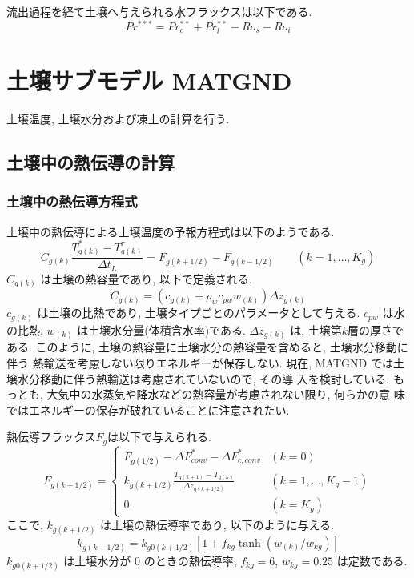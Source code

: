 流出過程を経て土壌へ与えられる水フラックスは以下である. 
\begin{equation}
 Pr^{***} = Pr^{**}_c + Pr^{**}_l - Ro_s - Ro_i
\end{equation}

\section{土壌サブモデル MATGND}

土壌温度, 土壌水分および凍土の計算を行う. 

\subsection{土壌中の熱伝導の計算}

\subsubsection{土壌中の熱伝導方程式}

土壌中の熱伝導による土壌温度の予報方程式は以下のようである. 
\begin{equation}
C_{g(k)} \frac{T_{g(k)}^* - T_{g(k)}^{\tau}}{\Delta t_L} = F_{g(k+1/2)} - F_{g(k-1/2)}
\qquad (k=1,\ldots,K_{g}) 
\label{gnd_diff}
\end{equation}
$C_{g(k)}$ は土壌の熱容量であり, 以下で定義される. 
\begin{equation}
 C_{g(k)} = ( c_{g(k)} + \rho_w c_{pw} w_{(k)} ) \Delta z_{g(k)}
\end{equation}
$c_{g(k)}$ は土壌の比熱であり, 土壌タイプごとのパラメータとして与える. 
$c_{pw}$ は水の比熱, $w_{(k)}$ は土壌水分量(体積含水率)である. 
$\Delta z_{g(k)}$ は, 土壌第$k$層の厚さである. 
このように, 土壌の熱容量に土壌水分の熱容量を含めると, 土壌水分移動に伴う
熱輸送を考慮しない限りエネルギーが保存しない. 
現在, MATGND では土壌水分移動に伴う熱輸送は考慮されていないので, その導
入を検討している. 
もっとも, 大気中の水蒸気や降水などの熱容量が考慮されない限り, 何らかの意
味ではエネルギーの保存が破れていることに注意されたい. 

熱伝導フラックス$F_{g}$は以下で与えられる. 
\begin{equation}
 F_{g(k+1/2)} =
\left\{
\begin{array}{ll}
F_{g(1/2)} - \Delta F_{conv}^* - \Delta F_{c,conv}^*
& (k=0)\\
\displaystyle{
k_{g(k+1/2)} \frac{T_{g(k+1)} - T_{g(k)}}{\Delta z_{g(k+1/2)}}
}
& (k=1,\ldots,K_{g}-1) \\
\displaystyle{
0
}
& (k=K_{g})
\end{array}
\right. 
\label{gnd_dflux}
\end{equation}
ここで, $k_{g(k+1/2)}$ は土壌の熱伝導率であり, 以下のように与える. 
\begin{equation}
 k_{g(k+1/2)} = k_{g0(k+1/2)} [ 1 + f_{kg} \tanh( w_{(k)}/ w_{kg} ) ]
\end{equation}
$k_{g0(k+1/2)}$ は土壌水分が $0$ のときの熱伝導率, $f_{kg}=6$,
$w_{kg}=0.25$ は定数である. 

